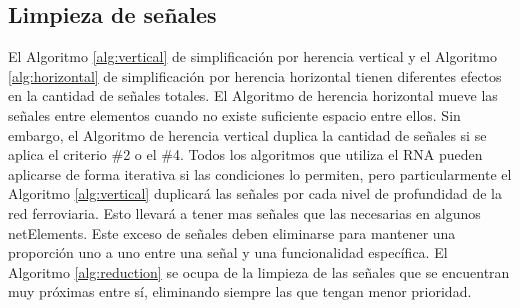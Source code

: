 \subsection{Limpieza de señales}
	\label{sec:limpieza}

	
	El Algoritmo \ref{alg:vertical} de simplificación por herencia vertical y el Algoritmo \ref{alg:horizontal} de simplificación por herencia horizontal tienen diferentes efectos en la cantidad de señales totales. El Algoritmo de herencia horizontal mueve las señales entre elementos cuando no existe suficiente espacio entre ellos. Sin embargo, el Algoritmo de herencia vertical duplica la cantidad de señales si se aplica el criterio \#2 o el \#4. Todos los algoritmos que utiliza el RNA pueden aplicarse de forma iterativa si las condiciones lo permiten, pero particularmente el Algoritmo \ref{alg:vertical} duplicará las señales por cada nivel de profundidad de la red ferroviaria. Esto llevará a tener mas señales que las necesarias en algunos netElements. Este exceso de señales deben eliminarse para mantener una proporción uno a uno entre una señal y una funcionalidad específica. El Algoritmo \ref{alg:reduction} se ocupa de la limpieza de las señales que se encuentran muy próximas entre sí, eliminando siempre las que tengan menor prioridad. 

